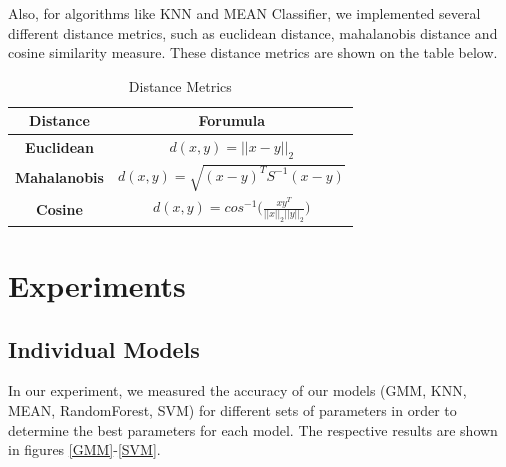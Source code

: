 \documentclass[10pt,journal,compsoc]{IEEEtran}
\begin{document}
Also, for algorithms like KNN and MEAN Classifier,
we implemented several different distance metrics,
such as euclidean distance, mahalanobis distance
and cosine similarity measure.
These distance metrics are shown on the table
below.
\begin{table}[!h]
	\renewcommand{\arraystretch}{2.5}
	\caption{Distance Metrics}
	\label{transformation}
	\centering
\begin{tabular}{|c|c|}
	\hline
	Distance & Forumula\\
	\hline
	\textbf{Euclidean} & $d(x,y) = ||x-y||_2$\\
	\hline
	\textbf{Mahalanobis} & $d(x,y) = \sqrt{(x-y)^TS^{-1}(x-y)}$\\
	\hline
	\textbf{Cosine} & $d(x,y) = cos^{-1}\Big(\frac{xy^T}{||x||_2||y||_2}\Big)$\\
	\hline
\end{tabular}
\end{table}

\section{Experiments}
\subsection{Individual Models}
In our experiment, we measured the accuracy of
our models (GMM, KNN, MEAN, RandomForest, SVM) for
different sets of parameters in order to determine
the best parameters for each model.
The respective results are shown in figures
\ref{GMM}-\ref{SVM}.


\end{document}
